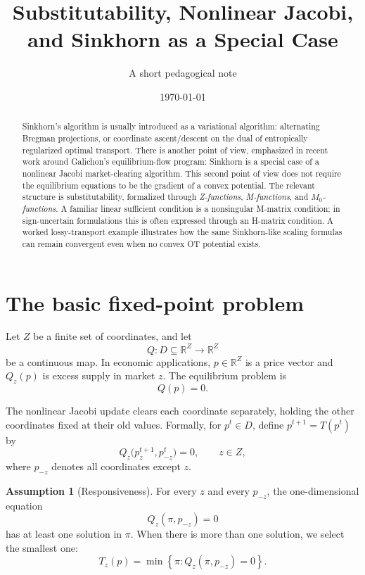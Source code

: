 \documentclass[11pt]{article}
\title{Substitutability, Nonlinear Jacobi, and Sinkhorn as a Special Case}
\author{A short pedagogical note}
\date{\today}
\newcommand{\R}{\mathbb{R}}
\newcommand{\braces}[1]{\left\{#1\right\}}
\theoremstyle{definition}
\newtheorem{assumption}[definition]{Assumption}
\theoremstyle{plain}
\begin{document}
\maketitle

\begin{abstract}
Sinkhorn's algorithm is usually introduced as a variational algorithm: alternating Bregman projections, or coordinate ascent/descent on the dual of entropically regularized optimal transport. There is another point of view, emphasized in recent work around Galichon's equilibrium-flow program: Sinkhorn is a special case of a nonlinear Jacobi market-clearing algorithm. This second point of view does not require the equilibrium equations to be the gradient of a convex potential. The relevant structure is substitutability, formalized through \emph{Z-functions}, \emph{M-functions}, and \emph{$M_0$-functions}. A familiar linear sufficient condition is a nonsingular M-matrix condition; in sign-uncertain formulations this is often expressed through an H-matrix condition. A worked lossy-transport example illustrates how the same Sinkhorn-like scaling formulas can remain convergent even when no convex OT potential exists.
\end{abstract}

\tableofcontents

\section{The basic fixed-point problem}

Let $Z$ be a finite set of coordinates, and let
\[
        Q : D \subseteq \R^Z \longrightarrow \R^Z
\]
be a continuous map. In economic applications, $p\in \R^Z$ is a price vector and $Q_z(p)$ is excess supply in market $z$. The equilibrium problem is
\begin{equation}\label{eq:Qzero}
        Q(p)=0.
\end{equation}

The nonlinear Jacobi update clears each coordinate separately, holding the other coordinates fixed at their old values. Formally, for $p^t\in D$, define $p^{t+1}=T(p^t)$ by
\begin{equation}\label{eq:jacobi}
        Q_z\bigl(p^{t+1}_z,p^t_{-z}\bigr)=0,\qquad z\in Z,
\end{equation}
where $p_{-z}$ denotes all coordinates except $z$.

\begin{assumption}[Responsiveness]
For every $z$ and every $p_{-z}$, the one-dimensional equation
\[
        Q_z(\pi,p_{-z})=0
\]
has at least one solution in $\pi$. When there is more than one solution, we select the smallest one:
\[
        T_z(p)=\min\braces{\pi:Q_z(\pi,p_{-z})=0}.
\]
\end{assumption}
\end{document}
